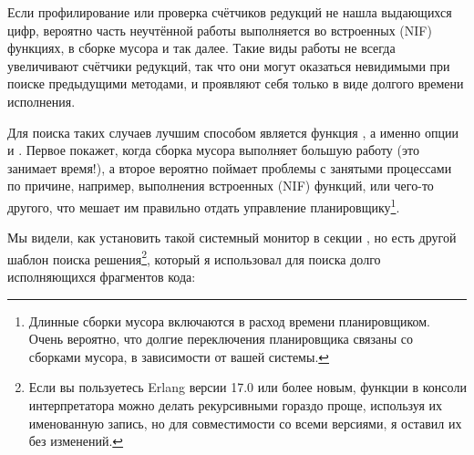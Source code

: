 Если профилирование или проверка счётчиков редукций не нашла выдающихся цифр, вероятно часть неучтённой работы выполняется во встроенных (NIF) функциях, в сборке мусора и так далее. Такие виды работы не всегда увеличивают счётчики редукций, так что они могут оказаться невидимыми при поиске предыдущими методами, и проявляют себя только в виде долгого времени исполнения.

Для поиска таких случаев лучшим способом является функция , а именно опции  и . Первое покажет, когда сборка мусора выполняет большую работу (это занимает время!), а второе вероятно поймает проблемы с занятыми процессами по причине, например, выполнения встроенных (NIF) функций, или чего-то другого, что мешает им правильно отдать управление планировщику\footnote{Длинные сборки мусора включаются в расход времени планировщиком. Очень вероятно, что долгие переключения планировщика связаны со сборками мусора, в зависимости от вашей системы.}.

Мы видели, как установить такой системный монитор в секции , но есть другой шаблон поиска решения\footnote{Если вы пользуетесь Erlang версии 17.0 или более новым, функции в консоли интерпретатора можно делать рекурсивными гораздо проще, используя их именованную запись, но для совместимости со всеми версиями, я оставил их без изменений.}, который я использовал для поиска долго исполняющихся фрагментов кода:

